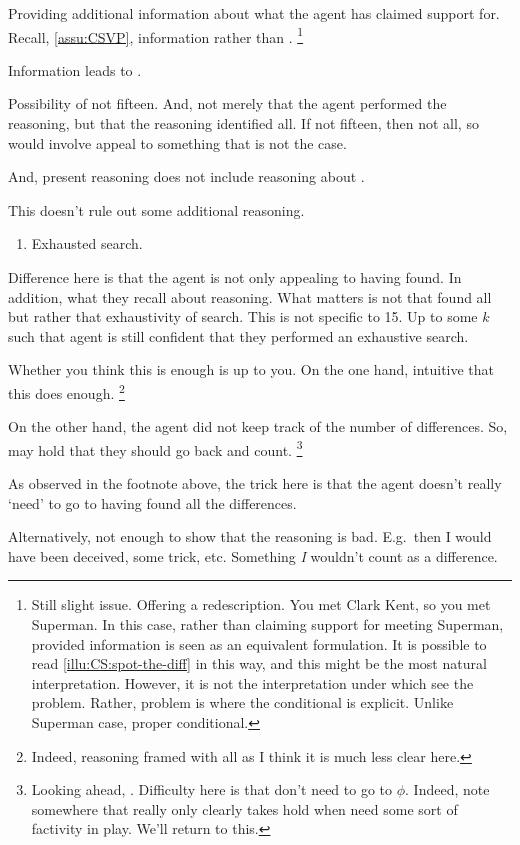 \begin{note}
    Providing additional information about what the agent has claimed support for.
  Recall, \autoref{assu:CSVP}, information rather than \world{}.
  \nolinebreak
  \footnote{
    Still slight issue.
    Offering a redescription.
    You met Clark Kent, so you met Superman.
    In this case, rather than claiming support for meeting Superman, provided information is seen as an equivalent formulation.
    It is possible to read \autoref{illu:CS:spot-the-diff} in this way, and this might be the most natural interpretation.
    However, it is not the interpretation under which see the problem.
    Rather, problem is where the conditional is explicit.
    Unlike Superman case, proper conditional.
  }
\end{note}

\begin{note}
  Information leads to \requ{}.

  Possibility of not fifteen.
  And, not merely that the agent performed the reasoning, but that the reasoning identified all.
  If not fifteen, then not all, so would involve appeal to something that is not the case.

  And, present reasoning does not include reasoning about \requ{}.
\end{note}

\begin{note}
  This doesn't rule out some additional reasoning.
  \begin{enumerate}
  \item Exhausted search.
  \end{enumerate}
  Difference here is that the agent is not only appealing to having found.
  In addition, what they recall about reasoning.
  What matters is not that found all but rather that exhaustivity of search.
  This is not specific to 15.
  Up to some \(k\) such that agent is still confident that they performed an exhaustive search.

  Whether you think this is enough is up to you.
  On the one hand, intuitive that this does enough.\nolinebreak
  \footnote{
    Indeed, reasoning framed with all as I think it is much less clear here.
  }

  On the other hand, the agent did not keep track of the number of differences.
  So, may hold that they should go back and count.\nolinebreak
  \footnote{
    Looking ahead, \nI{}.
    Difficulty here is that don't need to go to \(\phi\).
    Indeed, note somewhere that \nI{} really only clearly takes hold when need some sort of factivity in play.
    We'll return to this.
  }

  {
    \color{red} As observed in the footnote above, the trick here is that the agent doesn't really `need' to go to having found all the differences.

    Alternatively, not enough to show that the reasoning is bad.
    E.g.\ then I would have been deceived, some trick, etc.
    Something \emph{I} wouldn't count as a difference.
  }
\end{note}

